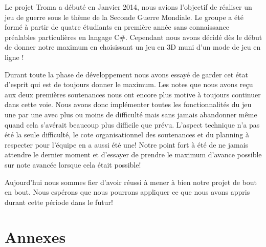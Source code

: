 \documentclass[11pt]{report}
\begin{document}
Le projet Troma a débuté en Janvier 2014, nous avions l'objectif de réaliser un jeu de guerre sous le thème de la Seconde Guerre Mondiale. Le groupe a été formé à partir de quatre étudiants en première année sans connaissance préalables particulières en langage C\#. Cependant nous avons décidé dès le début de donner notre maximum en choisissant un jeu en 3D muni d'un mode de jeu en ligne ! 

Durant toute la phase de développement nous avons essayé de garder cet état d'esprit qui est de toujours donner le maximum. Les notes que nous avons reçu aux deux premières soutenances nous ont encore plus motive à toujours continuer dans cette voie. Nous avons donc implémenter toutes les fonctionnalités du jeu une par une avec plus ou moins de difficulté mais sans jamais abandonner même quand cela s’avérait beaucoup plus difficile que prévu. L'aspect technique n'a pas été la seule difficulté, le cote organisationnel des soutenances et du planning à respecter pour l'équipe en a aussi été une! Notre point fort à été de ne jamais attendre le dernier moment et d'essayer de prendre le maximum d'avance possible sur note avancée lorsque cela était possible!

Aujourd'hui nous sommes fier d'avoir réussi à mener à bien notre projet de bout en bout. Nous espérons que nous pourrons appliquer ce que nous avons appris durant cette période dans le futur!

\newpage
{}
\part*{Annexes}

\newpage
\listoffigures

\newpage
\tableofcontents
 
\end{document}
